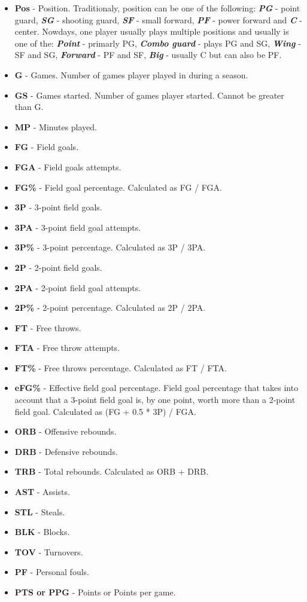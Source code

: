 \documentclass[a4paper]{article}
\begin{document}
\begin{itemize}
	\item \textbf{Pos} - Position. Traditionaly, position can be one of the following: \textit{\textbf{PG}} - point guard, \textit{\textbf{SG}} - shooting guard, \textit{\textbf{SF}} - small forward, \textit{\textbf{PF}} - power forward and \textit{\textbf{C}} - center. Nowdays, one player usually plays multiple positions and usually is one of the: \textit{\textbf{Point}} - primarly PG, \textit{\textbf{Combo guard}} - plays PG and SG, \textit{\textbf{Wing}} - SF and SG, \textit{\textbf{Forward}} - PF and SF, \textit{\textbf{Big}} - usually C but can also be PF.
	\item \textbf{G} - Games. Number of games player played in during a season.
	\item \textbf{GS} - Games started. Number of games player started. Cannot be greater than G.
	\item \textbf{MP} - Minutes played.
	\item \textbf{FG} - Field goals.
	\item \textbf{FGA} - Field goals attempts.
	\item \textbf{FG\%} - Field goal percentage. Calculated as FG / FGA.
	\item \textbf{3P} - 3-point field goals.
	\item \textbf{3PA} - 3-point field goal attempts.
	\item \textbf{3P\%} - 3-point percentage. Calculated as 3P / 3PA.
	\item \textbf{2P} - 2-point field goals. 
	\item \textbf{2PA} - 2-point field goal attempts.
	\item \textbf{2P\%} - 2-point percentage. Calculated as 2P / 2PA.
	\item \textbf{FT} - Free throws.
	\item \textbf{FTA} - Free throw attempts.
	\item \textbf{FT\%} - Free throws percentage. Calculated as FT / FTA.
	\item \textbf{eFG\%} - Effective field goal percentage. Field goal percentage that takes into account that a 3-point field goal is, by one point, worth more than a 2-point field goal. Calculated as (FG + 0.5 * 3P) / FGA.
	\item \textbf{ORB} - Offensive rebounds.
	\item \textbf{DRB} - Defensive rebounds.
	\item \textbf{TRB} - Total rebounds. Calculated as ORB + DRB.
	\item \textbf{AST} - Assists.
	\item \textbf{STL} - Steals.
	\item \textbf{BLK} - Blocks.
	\item \textbf{TOV} - Turnovers.
	\item \textbf{PF} - Personal fouls.
	\item \textbf{PTS or PPG} - Points or Points per game.	
\end{itemize}	
	
\end{document}
